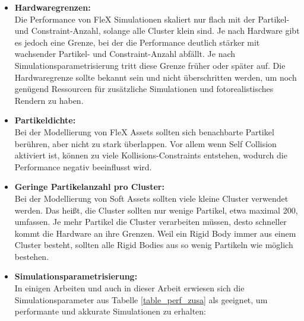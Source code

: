    \begin{itemize}
    
      \item \textbf{Hardwaregrenzen:} \\Die Performance von FleX Simulationen skaliert nur flach mit der Partikel- und Constraint-Anzahl, solange alle Cluster klein sind. Je nach Hardware gibt es jedoch eine Grenze, bei der die Performance deutlich stärker mit wachsender Partikel- und Constraint-Anzahl abfällt. Je nach Simulationsparametrisierung tritt diese Grenze früher oder später auf. Die Hardwaregrenze sollte bekannt sein und nicht überschritten werden, um noch genügend Ressourcen für zusätzliche Simulationen und fotorealistisches Rendern zu haben.
      
      \item \textbf{Partikeldichte:} \\ Bei der Modellierung von FleX Assets sollten sich benachbarte Partikel berühren, aber nicht zu stark überlappen. Vor allem wenn Self Collision aktiviert ist, können zu viele Kollisions-Constraints entstehen, wodurch die Performance negativ beeinflusst wird.
      
      \item \textbf{Geringe Partikelanzahl pro Cluster:} \\ Bei der Modellierung von Soft Assets sollten viele kleine Cluster verwendet werden. Das heißt, die Cluster sollten nur wenige Partikel, etwa maximal 200, umfassen. Je mehr Partikel die Cluster verarbeiten müssen, desto schneller kommt die Hardware an ihre Grenzen. Weil ein Rigid Body immer aus einem Cluster besteht, sollten alle Rigid Bodies aus so wenig Partikeln wie möglich bestehen.
      

      
      \item \textbf{Simulationsparametrisierung:} \\ In einigen Arbeiten und auch in dieser Arbeit erwiesen sich die Simulationsparameter aus Tabelle \ref{table_perf_zusa} als geeignet, um performante und akkurate Simulationen zu erhalten:
      
    \end{itemize}

